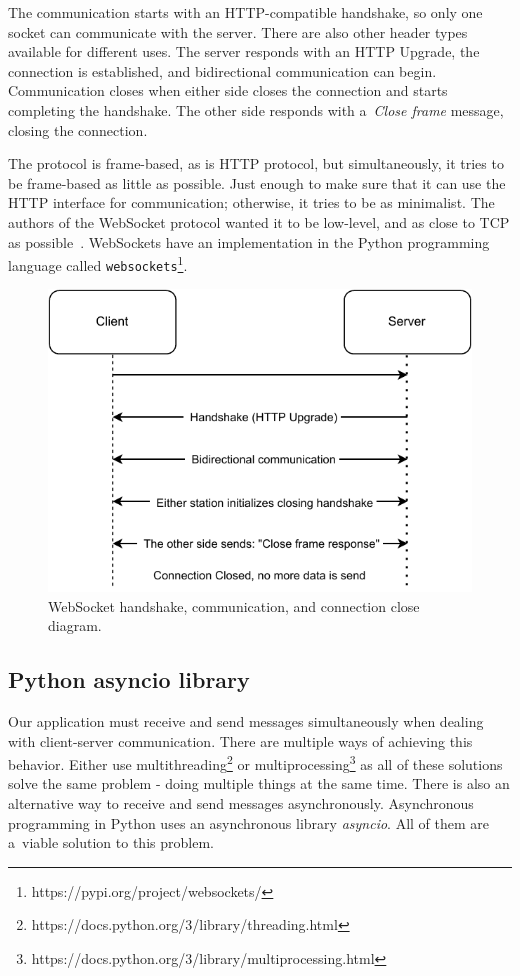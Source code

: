 The communication starts with an HTTP-compatible handshake, so only one socket can communicate with the server. There are also other header types available for different uses. The server responds with an HTTP Upgrade, the connection is established, and bidirectional communication can begin. Communication closes when either side closes the connection and starts completing the handshake. The other side responds with a~\textit{Close frame} message, closing the connection. 

The protocol is frame-based, as is HTTP protocol, but simultaneously, it tries to be frame-based as little as possible. Just enough to make sure that it can use the HTTP interface for communication; otherwise, it tries to be as minimalist. The authors of the WebSocket protocol wanted it to be low-level, and as close to TCP as possible~\cite{websock}. WebSockets have an implementation in the Python programming language called \verb|websockets|\footnote{https://pypi.org/project/websockets/}.

\begin{figure}[h]
    \centering
    \includegraphics{pdf/websocket.drawio.pdf}
    \caption{WebSocket handshake, communication, and connection close diagram.}
    \label{fig:websocket}
\end{figure}

\newpage
\subsection{Python asyncio library}

Our application must receive and send messages simultaneously when dealing with client-server communication. There are multiple ways of achieving this behavior. Either use multithreading\footnote{https://docs.python.org/3/library/threading.html} or multiprocessing\footnote{https://docs.python.org/3/library/multiprocessing.html} as all of these solutions solve the same problem - doing multiple things at the same time. There is also an alternative way to receive and send messages asynchronously. Asynchronous programming in Python uses an asynchronous library \textit{asyncio}. All of them are a~viable solution to this problem.

